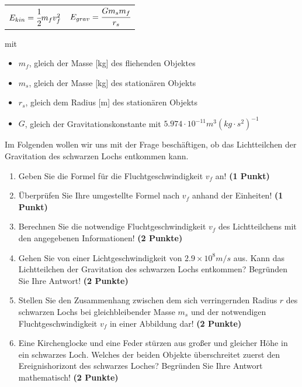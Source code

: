 \documentclass[a4paper, 9pt]{scrartcl}\usepackage[]{graphicx}\usepackage[]{xcolor}
\begin{document}
\begin{center}
  \begin{tabular}{cc}
    $E_{kin} = \cfrac{1}{2}m_fv_f^2$ & $E_{grav} = \cfrac{Gm_sm_f}{r_s}$\\
  \end{tabular}
\end{center}

mit

\begin{itemize}[noitemsep]
\item $m_f$, gleich der Masse [kg] des fliehenden Objektes
\item $m_s$, gleich der Masse [kg] des station{\"a}ren Objekts
\item $r_s$, gleich dem Radius [m] des station{\"a}ren Objekts  
\item $G$, gleich der Gravitationskonstante mit $5.974 \cdot 10^{-11}
  m^3(kg \cdot s^2)^{-1}$ 
\end{itemize}

Im Folgenden wollen wir uns mit der Frage besch{\"a}ftigen, ob das
Lichtteilchen der Gravitation des schwarzen Lochs entkommen kann.

\begin{enumerate}
\item Geben Sie die Formel f{\"u}r die Fluchtgeschwindigkeit $v_f$ an! 
  \textbf{(1 Punkt)}
\item {\"U}berpr{\"u}fen Sie Ihre umgestellte Formel nach $v_f$ anhand der Einheiten!
  \textbf{(1 Punkt)} 
\item Berechnen Sie die notwendige Fluchtgeschwindigkeit $v_f$ des
  Lichtteilchens mit den angegebenen Informationen! \textbf{(2 Punkte)}
\item Gehen Sie von einer Lichtgeschwindigkeit von $\ensuremath{2.9\times 10^{8}}m/s$
  aus. Kann das Lichtteilchen der Gravitation des schwarzen Lochs
  entkommen? Begr{\"u}nden Sie Ihre Antwort! \textbf{(2 Punkte)}
\item Stellen Sie den Zusammenhang zwischen dem sich verringernden Radius
  $r$ des schwarzen Lochs bei gleichbleibender Masse $m_s$
  und der notwendigen Fluchtgeschwindigkeit $v_f$ in einer Abbildung dar!
  \textbf{(2 Punkte)}
 \item Eine Kirchenglocke und eine Feder st{\"u}rzen aus gro{\ss}er und gleicher H{\"o}he
  in ein schwarzes Loch. Welches der beiden Objekte {\"u}berschreitet zuerst
  den Ereignishorizont des schwarzes Loches? Begr{\"u}nden
  Sie Ihre Antwort mathematisch! \textbf{(2 Punkte)}  
\end{enumerate}
\end{document}
